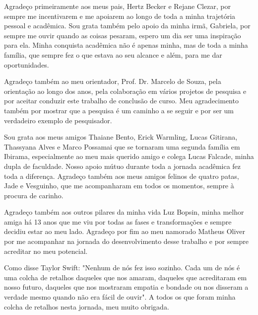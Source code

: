 \begin{agradecimentos}

Agradeço primeiramente aos meus pais, Hertz Becker e Rejane Clezar, por sempre me incentivarem e me apoiarem ao longo de toda a minha trajetória pessoal e acadêmica. Sou grata também pelo apoio da minha irmã, Gabriela, por sempre me ouvir quando as coisas pesaram, espero um dia ser uma inspiração para ela. Minha conquista acadêmica não é apenas minha, mas de toda a minha família, que sempre fez o que estava ao seu alcance e além, para me dar oportunidades.

Agradeço também ao meu orientador, Prof. Dr. Marcelo de Souza, pela orientação ao longo dos anos, pela colaboração em vários projetos de pesquisa e por aceitar conduzir este trabalho de conclusão de curso. Meu agradecimento também por mostrar que a pesquisa é um caminho a se seguir e por ser um verdadeiro exemplo de pesquisador.

Sou grata aos meus amigos Thaiane Bento, Erick Warmling, Lucas Gitirana, Thassyana Alves e Marco Possamai que se tornaram uma segunda família em Ibirama, especialmente ao meu mais querido amigo e colega Lucas Falcade, minha dupla de faculdade. Nosso apoio mútuo durante toda a jornada acadêmica fez toda a diferença. Agradeço também aos meus amigos felinos de quatro patas, Jade e Vesguinho, que me acompanharam em todos os momentos, sempre à procura de carinho.

Agradeço também aos outros pilares da minha vida Luz Bopsin, minha melhor amiga há 13 anos que me viu por todas as fases e transformações e sempre decidiu estar ao meu lado. Agradeço por fim ao meu namorado Matheus Oliver por me acompanhar na jornada do desenvolvimento desse trabalho e por sempre acreditar no meu potencial. 

Como disse Taylor Swift: "Nenhum de nós fez isso sozinho. Cada um de nós é uma colcha de retalhos daqueles que nos amaram, daqueles que acreditaram em nosso futuro, daqueles que nos mostraram empatia e bondade ou nos disseram a verdade mesmo quando não era fácil de ouvir". A todos os que foram minha colcha de retalhos nesta jornada, meu muito obrigada.


\end{agradecimentos}
